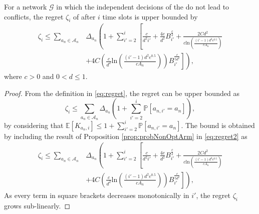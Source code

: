 \begin{theorem}
\label{theo:regret}
For a network $\mathcal{G}$ in which the independent decisions of the \nodes{} do not lead to conflicts, the regret $\zeta_i$ of \name{} after $i$ time slots is upper bounded by
\begin{align*}
    \zeta_i \leq \!\!\sum_{a_n\in \mathcal{A}_n} & \!\!\Delta_{a_n} \!\!\left(1+\sum_{i'=2}^i\left[ \frac{c}{d^2i'} + \frac{4e}{d^2}B_{i'}^{\frac{c}{2}} +  \frac{2Cd^2}{c \mathrm{ln}\left(\frac{(i'-1)d^2e^{0.5}}{cA_n}\right)}\right.\right. \\ 
    & + \left.\left. 4C\left(\frac{c}{d^2}\mathrm{ln}\left(\frac{(i'-1)d^2e^{0.5}}{c A_n}\right)\right) B_{i'}^{\frac{c}{5d^2}} \right]\right),
\end{align*}
where 
$c > 0$ and $0 < d \leq 1$.
\end{theorem}

\begin{proof}
From the definition in \eqref{eq:regret}, the regret can be upper bounded as 
\begin{equation}
\zeta_i \leq \sum_{a_n\in\mathcal{A}_n}{\Delta_{a_n} \left(1+\sum_{i'=2}^i\mathbb{P}[a_{n,i'}=a_n]\right)} \label{eq:regret2},
\end{equation}
by considering that $\mathbb{E}[K_{a_n,i}]\leq 1+\sum_{i'=2}^i\mathbb{P}[a_{n,i'}=a_n]$. 
The bound is obtained by including the result of Proposition \ref{prop:probNonOptArm} in \eqref{eq:regret2} as
\begin{align}
    \zeta_i \leq \!\!\sum_{a_n\in \mathcal{A}_n} & \!\! \Delta_{a_n}\!\! \left(1+\sum_{i'=2}^i\left[ \frac{c}{d^2i'} + \frac{4e}{d^2}B_{i'}^{\frac{c}{2}}  + \frac{2Cd^2}{c \mathrm{ln}\left(\frac{(i'-1)d^2e^{0.5}}{cA_n}\right)}
    \right.\right. \nonumber \\
    &+ \left.\left. 4C\left(\frac{c}{d^2}\mathrm{ln}\left(\frac{(i'-1)d^2e^{0.5}}{c A_n}\right)\right) B_{i'}^{\frac{c}{5d^2}}  \right]\right),
\end{align}
As every term in square brackets decreases monotonically in $i'$, the regret $\zeta_i$ grows sub-linearly.

\end{proof}  

